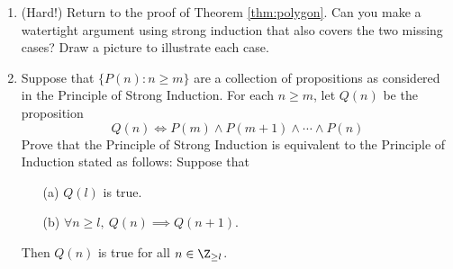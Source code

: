 \begin{exercises}{}{}
\begin{enumerate}
	\item (Hard!) Return to the proof of Theorem \ref{thm:polygon}. Can you make a watertight argument using strong induction that also covers the two missing cases? Draw a picture to illustrate each case.
	
	\item Suppose that $\{P(n):n\ge m\}$ are a collection of propositions as considered in the Principle of Strong Induction. For each $n\ge m$, let $Q(n)$ be the proposition
	\[Q(n)\iff P(m)\wedge P(m+1)\wedge\cdots\wedge P(n)\]
	Prove that the Principle of Strong Induction is equivalent to the Principle of Induction stated as follows: Suppose that
	\begin{enumerate}
  	\item[(a)] $Q(l)$ is true.
  	\item[(b)] $\forall n\ge l,\ Q(n)\implies Q(n+1)$.
	\end{enumerate}
	Then $Q(n)$ is true for all $n\in\Z_{\ge l}$.
	
\end{enumerate}
\end{exercises}

\fi
